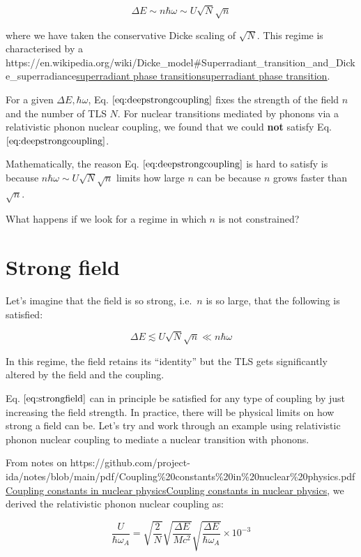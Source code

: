 \documentclass[
]{article}
\let\oldhref\href
\renewcommand{\href}[2]{\ifx#1\urlprefix\oldhref{#1}{#2}\else\uline{\oldhref{#1}{#2}}\fi}
\renewcommand{\[}{\begin{equation}}
\renewcommand{\]}{\end{equation}}
\begin{document}
\[
\Delta E \sim n\hbar\omega \sim U\sqrt{N}\sqrt{n}
\label{eq:deepstrongcoupling}
\]

where we have taken the conservative Dicke scaling of \(\sqrt{N}\). This
regime is characterised by a
\href{https://en.wikipedia.org/wiki/Dicke_model\#Superradiant_transition_and_Dicke_superradiance}{superradiant
phase transition}.

For a given \(\Delta E, \hbar\omega\), Eq.
\(\ref{eq:deepstrongcoupling}\) fixes the strength of the field \(n\)
and the number of TLS \(N\). For nuclear transitions mediated by phonons
via a relativistic phonon nuclear coupling, we found that we could
\textbf{not} satisfy Eq. \(\ref{eq:deepstrongcoupling}\).

Mathematically, the reason Eq. \(\ref{eq:deepstrongcoupling}\) is hard
to satisfy is because \(n\hbar\omega \sim U\sqrt{N}\sqrt{n}\) limits how
large \(n\) can be because \(n\) grows faster than \(\sqrt{n}\).

What happens if we look for a regime in which \(n\) is not constrained?

\section{Strong field}\label{strong-field}

Let's imagine that the field is so strong, i.e.~\(n\) is so large, that
the following is satisfied:

\[
\Delta E \lesssim U\sqrt{N}\sqrt{n} \ll n\hbar \omega
\label{eq:strongfield}
\]

In this regime, the field retains its ``identity'' but the TLS gets
significantly altered by the field and the coupling.

Eq. \(\ref{eq:strongfield}\) can in principle be satisfied for any type
of coupling by just increasing the field strength. In practice, there
will be physical limits on how strong a field can be. Let's try and work
through an example using relativistic phonon nuclear coupling to mediate
a nuclear transition with phonons.

From notes on
\href{https://github.com/project-ida/notes/blob/main/pdf/Coupling\%20constants\%20in\%20nuclear\%20physics.pdf}{Coupling
constants in nuclear physics}, we derived the relativistic phonon
nuclear coupling as:

\[
\frac{U}{\hbar \omega_A} = \sqrt{\frac{2}{N}} \sqrt{\frac{\Delta E}{M c^2}} \sqrt{\frac{\Delta E}{\hbar \omega_A}} \times 10^{-3}
\label{eq:phononcoupling}
\]
\end{document}
